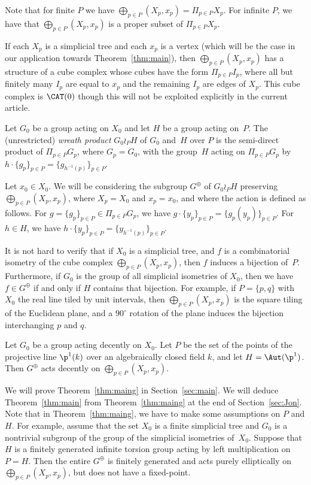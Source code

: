 Note that for finite $P$ we have $\bigoplus_{p\in P} (X_p,x_p)=\Pi_{p\in P} X_p$. For infinite $P$, we have that
$\bigoplus_{p\in P} (X_p,x_p)$ is a proper subset of $\Pi_{p\in P} X_p$.

If each $X_p$ is a simplicial tree and each $x_p$ is a vertex (which will be the case in our application towards Theorem~\ref{thm:main}), then $\bigoplus_{p\in P} (X_p,x_p)$ has a structure of a cube complex {whose cubes have the form $\Pi_{p\in P} I_p$, where all but finitely many $I_p$ are equal to $x_p$ and the remaining $I_p$ are edges of $X_p$}. This cube complex is $\CAT(0)$ though this will not be exploited explicitly in the current article.

Let $G_0$ be a group acting on $X_0$ and let $H$ be a group acting on~$P$. The (unrestricted) \emph{wreath product} $G_0\wr_P H$ of $G_0$ and~$H$ over $P$ is the semi-direct product of $\Pi_{p\in P} G_p$, where $G_p=G_0$, with the group~$H$ acting on $\Pi_{p\in P} G_p$ by $h\cdot \{g_p\}_{p\in P}=\{g_{h^{-1}(p)}\}_{p\in P}$.

Let $x_0\in X_0$. We will be considering the subgroup $G^\oplus$ of $G_0\wr_P H$ preserving $\bigoplus_{p\in P} (X_p,x_p)$, where $X_p=X_0$ and $x_p=x_0$, and where the action is defined as follows. For $g=\{g_p\}_{p\in P}\in \Pi_{p\in P}G_p$, we have $g \cdot \{y_p\}_{p\in P}=\{g_p(y_p)\}_{p\in P}$. For $h\in H$, we have $h\cdot \{y_p\}_{p\in P}=\{y_{h^{-1}(p)}\}_{p\in P}$.

It is not hard to verify that if $X_0$ is a simplicial tree, and $f$ is a combinatorial isometry of the cube complex $\bigoplus_{p\in P} (X_p,x_p)$, then $f$ induces a bijection of~$P$. Furthermore, if $G_0$ is the group of all simplicial isometries of $X_0$, then we have $f\in G^\oplus$ if and only if $H$ contains that bijection. For example, if $P=\{p,q\}$ with $X_0$ the real line tiled by unit intervals, then $\bigoplus_{p\in P} (X_p,x_p)$ is the square tiling of the Euclidean plane, and a $90^\circ$ rotation of the plane induces the bijection interchanging $p$ and $q$.

\begin{theorem}
\label{thm:maing}
Let $G_0$ be a group acting decently on $X_0$. Let $P$ be the set of {the points of the projective line $\p^1(k)$} over an algebraically closed field $k$, and let $H=\Aut(\p^1)$. Then $G^\oplus$ acts decently on $\bigoplus_{p\in P} (X_p,x_p)$. \end{theorem}

We will prove Theorem~\ref{thm:maing} in Section~\ref{sec:main}. {We will deduce Theorem~\ref{thm:main} from Theorem~\ref{thm:maing} at the end of Section~\ref{sec:Jon}}.
Note that in Theorem~\ref{thm:maing}, we have to make some assumptions on $P$ and $H$. For example, assume that the set $X_0$ is {a finite simplicial tree and $G_0$ is a nontrivial subgroup of the group of the simplicial isometries of~$X_0$}. Suppose that $H$ is a finitely generated infinite torsion group acting by left multiplication on $P=H$. Then the entire $G^\oplus$ is finitely generated and acts purely elliptically on $\bigoplus_{p\in P} (X_p,x_p)$, but does not have a fixed-point.

